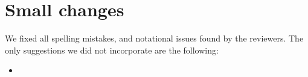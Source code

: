\documentclass{article}
\begin{document}
\section{Small changes}
 We fixed all spelling mistakes, and notational issues found by the reviewers. The only suggestions we did not incorporate are the following: 
\begin{itemize}
	\item 
\end{itemize}



\end{document}
